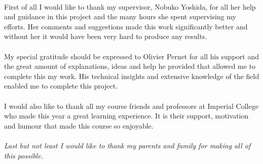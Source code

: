 
\begin{acknowledgements}

\paragraph*{}
First of all I would like to thank my supervisor, Nobuko Yoshida, for all her help and guidance in this project and the many hours she spent supervising my efforts. Her comments and suggestions made this work significantly better and without her it would have been very hard to produce any results. 

\paragraph*{}
My special gratitude should be expressed to Olivier Pernet for all his support and the great amount of explanations, ideas and help he provided that allowed me to complete this my work. His technical insights and extensive knowledge of the field enabled me to complete this project.
 
\paragraph*{}
I would also like to thank all my course friends and professors at Imperial College who made this year a great learning experience. It is their support, motivation and humour that made this course so enjoyable.

\vskip 1in
\paragraph*{}
\textit{Last but not least I would like to thank my parents and family for making all of this possible.}
   




\end{acknowledgements}